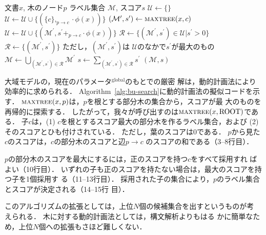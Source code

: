 \documentclass[japanese]{jnlp_1.4}
\newcommand{\vect}[1]{}
\begin{document}
\begin{algorithm}[t]
\caption{
$\mbox{\sc maxtree}(x, p)$ }
\label{alg:bu-search}
\DeclarePairedDelimiter\norm{\lVert}{\rVert}
\renewcommand{\algorithmicrequire}{}
\renewcommand{\algorithmicensure}{}
\setlength{\baselineskip}{11pt}
\begin{algorithmic}[1]
\REQUIRE 文書$x$, 木のノード$p$
\ENSURE ラベル集合 $\mathcal{M}$, スコア$s$
\STATE $\mathcal{U} \leftarrow \{\}$
    \STATE $\mathcal{U} \leftarrow \mathcal{U} \cup \{ (\{ c \}, \vect{w}_{p \rightarrow c} \cdot \phi(x)) \}$
  \ELSE
    \STATE $(\mathcal{M}^\prime, s^\prime)  \leftarrow \mbox{\sc maxtree}(x, c)$
    \STATE $\mathcal{U} \leftarrow \mathcal{U} \cup \{ (\mathcal{M}^\prime, s^\prime + \vect{w}_{p \rightarrow c} \cdot \phi(x)) \}$
  \ENDIF
\ENDFOR
\STATE $\mathcal{R} \leftarrow \{ (\mathcal{M}^\prime,s^\prime) \in \mathcal{U} | s^\prime > 0 \}$
  \STATE $\mathcal{R} \leftarrow \{(\mathcal{M}^\prime,s^\prime)\}$ ただし，$(\mathcal{M}^\prime,s^\prime)$は $\mathcal{U}$のなかで$s^\prime$が最大のもの
\ENDIF
\STATE $\mathcal{M} \leftarrow \bigcup_{(\mathcal{M}^\prime,s^\prime) \in \mathcal{R}} \mathcal{M}^\prime$
\STATE $s \leftarrow \sum_{(\mathcal{M}^\prime,s^\prime) \in \mathcal{R}} s^\prime$
\RETURN $(\mathcal{M}, s)$
\end{algorithmic}
\end{algorithm}


大域モデルの，現在のパラメータ$\vect{w}^{\mathrm{global}}$のもとでの厳密
解は，動的計画法により効率的に求められる．
Algorithm~\ref{alg:bu-search}に動的計画法の擬似コードを示す．
$\mbox{\sc maxtree}(x, p)$は，$p$を根とする部分木の集合から，スコアが最
大のものを再帰的に探索する．
したがって，我々が呼び出すのは$\mbox{\sc maxtree}(x, \mathrm{ROOT})$であ
る．
子$c$は，(1) $c$を根とするスコア最大の部分木を作るラベル集合，および (2)
そのスコアとひも付けされている．
ただし，葉のスコアは0である．
$p$から見た$c$のスコアは，$c$の部分木のスコアと辺$p \rightarrow c$
のスコアの和である（3--8行目）．

$p$の部分木のスコアを最大にするには，正のスコアを持つ$c$をすべて採用すれ
ばよい（10行目）．
いずれの子も正のスコアを持たない場合は，最大のスコアを持つ子を1個採用す
る（11--13行目）．
採用された子の集合により，$p$のラベル集合とスコアが決定される（14--15行
目）．

このアルゴリズムの拡張としては，上位$N$個の候補集合を出すというものが考
えられる．
木に対する動的計画法としては，構文解析\cite{McDonald2005full}よりもはる
かに簡単なため，上位$N$個への拡張\cite{Collins2005}もさほど難しくない．
\end{document}
